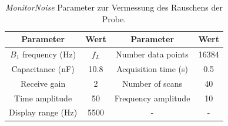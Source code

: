 \documentclass[../main.tex]{subfiles}
\begin{document}
        \begin{table}[H]
            \centering
            \begin{tabular}{cc|cc}
                 \textbf{Parameter} & \textbf{Wert} & \textbf{Parameter} & \textbf{Wert}  \\\hline\hline
                $B_1$ frequency (\si{\hertz}) & $f_L$ & Number data points & 16384\\\hline
                Capacitance (\si{\nano\farad}) & \num{10.8} & Acquisition time (\si{\second}) & \num{0.5}\\\hline
                Receive gain & 2 & Number of scans & 40\\\hline
                Time amplitude & 50 & Frequency amplitude & 10\\\hline
                Display range (\si{\hertz}) & 5500 & - & -
            \end{tabular}
            \caption{\textit{MonitorNoise} Parameter zur Vermessung des Rauschens der Probe.}
            \label{tab:DurchfuehrungTeil3Parameter}
        \end{table}
\end{document}
